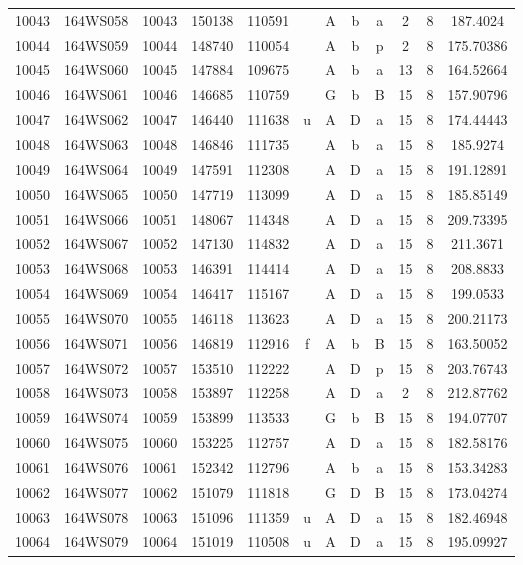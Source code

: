 \begin{tabular}{|*{12}{c|}}
10043 & 164WS058 & 10043 & 150138 & 110591 &  & A & b & a & 2 & 8 & 187.4024 \\ 
10044 & 164WS059 & 10044 & 148740 & 110054 &  & A & b & p & 2 & 8 & 175.70386 \\ 
10045 & 164WS060 & 10045 & 147884 & 109675 &  & A & b & a & 13 & 8 & 164.52664 \\ 
10046 & 164WS061 & 10046 & 146685 & 110759 &  & G & b & B & 15 & 8 & 157.90796 \\ 
10047 & 164WS062 & 10047 & 146440 & 111638 & u & A & D & a & 15 & 8 & 174.44443 \\ 
10048 & 164WS063 & 10048 & 146846 & 111735 &  & A & b & a & 15 & 8 & 185.9274 \\ 
10049 & 164WS064 & 10049 & 147591 & 112308 &  & A & D & a & 15 & 8 & 191.12891 \\ 
10050 & 164WS065 & 10050 & 147719 & 113099 &  & A & D & a & 15 & 8 & 185.85149 \\ 
10051 & 164WS066 & 10051 & 148067 & 114348 &  & A & D & a & 15 & 8 & 209.73395 \\ 
10052 & 164WS067 & 10052 & 147130 & 114832 &  & A & D & a & 15 & 8 & 211.3671 \\ 
10053 & 164WS068 & 10053 & 146391 & 114414 &  & A & D & a & 15 & 8 & 208.8833 \\ 
10054 & 164WS069 & 10054 & 146417 & 115167 &  & A & D & a & 15 & 8 & 199.0533 \\ 
10055 & 164WS070 & 10055 & 146118 & 113623 &  & A & D & a & 15 & 8 & 200.21173 \\ 
10056 & 164WS071 & 10056 & 146819 & 112916 & f & A & b & B & 15 & 8 & 163.50052 \\ 
10057 & 164WS072 & 10057 & 153510 & 112222 &  & A & D & p & 15 & 8 & 203.76743 \\ 
10058 & 164WS073 & 10058 & 153897 & 112258 &  & A & D & a & 2 & 8 & 212.87762 \\ 
10059 & 164WS074 & 10059 & 153899 & 113533 &  & G & b & B & 15 & 8 & 194.07707 \\ 
10060 & 164WS075 & 10060 & 153225 & 112757 &  & A & D & a & 15 & 8 & 182.58176 \\ 
10061 & 164WS076 & 10061 & 152342 & 112796 &  & A & b & a & 15 & 8 & 153.34283 \\ 
10062 & 164WS077 & 10062 & 151079 & 111818 &  & G & D & B & 15 & 8 & 173.04274 \\ 
10063 & 164WS078 & 10063 & 151096 & 111359 & u & A & D & a & 15 & 8 & 182.46948 \\ 
10064 & 164WS079 & 10064 & 151019 & 110508 & u & A & D & a & 15 & 8 & 195.09927 \\ 

\end{tabular}
